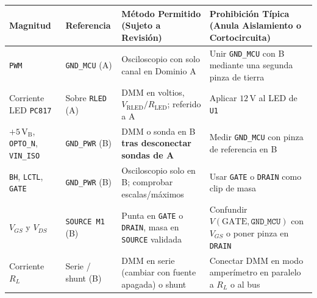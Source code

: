\documentclass[10pt, a4paper, landscape]{article}
\begin{document}
\par\vspace{0.06cm}\noindent
\renewcommand{\arraystretch}{1.15}
{\footnotesize
\begin{tabularx}{\linewidth}{|l|l|>{\raggedright\arraybackslash}X|>{\raggedright\arraybackslash}p{7.8cm}|}
\hline
\rowcolor{ucbgray}
\textbf{Magnitud} & \textbf{Referencia} & \textbf{Método Permitido (Sujeto a Revisión)} & \textbf{Prohibición Típica (Anula Aislamiento o Cortocircuita)} \\ \hline
\texttt{PWM} & \texttt{GND\_MCU} (A) & Osciloscopio con solo canal en Dominio A & Unir \texttt{GND\_MCU} con B mediante una segunda pinza de tierra \\ \hline
Corriente LED \texttt{PC817} & Sobre \texttt{RLED} (A) & DMM en voltios, $V_{\text{RLED}}/R_{\text{LED}}$; referido a A & Aplicar $12\,\text{V}$ al LED de \texttt{U1} \\ \hline
$+5\,\text{V}_{\text{B}}$, \texttt{OPTO\_N}, \texttt{VIN\_ISO} & \texttt{GND\_PWR} (B) & DMM o sonda en B \textbf{tras desconectar sondas de A} & Medir \texttt{GND\_MCU} con pinza de referencia en B \\ \hline
\texttt{BH}, \texttt{LCTL}, \texttt{GATE} & \texttt{GND\_PWR} (B) & Osciloscopio solo en B; comprobar escalas/máximos & Usar \texttt{GATE} o \texttt{DRAIN} como clip de masa \\ \hline
$V_{GS}$ y $V_{DS}$ & \texttt{SOURCE M1} (B) & Punta en \texttt{GATE} o \texttt{DRAIN}, masa en \texttt{SOURCE} validada & Confundir $V(\text{GATE}, \texttt{GND\_MCU})$ con $V_{GS}$ o poner pinza en \texttt{DRAIN} \\ \hline
Corriente $R_L$ & Serie / shunt (B) & DMM en serie (cambiar con fuente apagada) o shunt & Conectar DMM en modo amperímetro en paralelo a $R_L$ o al bus \\ \hline
\end{tabularx}
}
\end{document}
